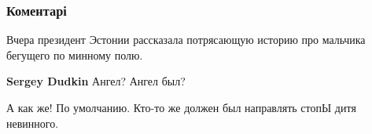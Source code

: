  
 
 
 
 
\subsubsection{Коментарі}

\begin{itemize}
 
Вчера президент Эстонии рассказала потрясающую историю про мальчика бегущего по минному полю.

\begin{itemize}
 
\textbf{Sergey Dudkin} Ангел? Ангел был? \Smiley[1.0][yellow]

 
А как же! По умолчанию. Кто-то же должен был направлять стопЫ дитя невинного.
\end{itemize}

 
🤝👏👏👏👏👏

 

\end{itemize}
